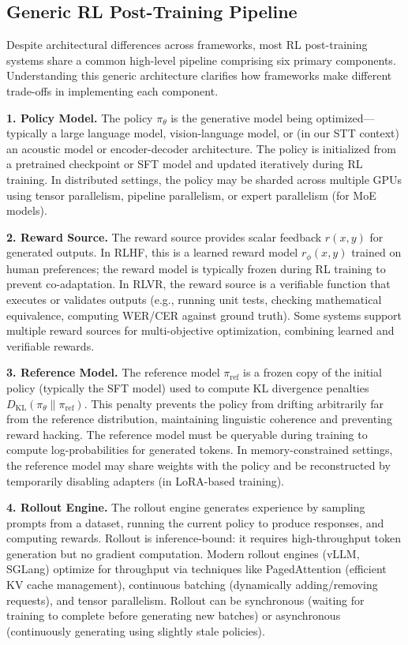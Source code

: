 \documentclass[conference]{IEEEtran}
\begin{document}
\subsection{Generic RL Post-Training Pipeline}

Despite architectural differences across frameworks, most RL post-training systems share a common high-level pipeline comprising six primary components. Understanding this generic architecture clarifies how frameworks make different trade-offs in implementing each component.

\textbf{1. Policy Model.} The policy $\pi_\theta$ is the generative model being optimized—typically a large language model, vision-language model, or (in our STT context) an acoustic model or encoder-decoder architecture. The policy is initialized from a pretrained checkpoint or SFT model and updated iteratively during RL training. In distributed settings, the policy may be sharded across multiple GPUs using tensor parallelism, pipeline parallelism, or expert parallelism (for MoE models).

\textbf{2. Reward Source.} The reward source provides scalar feedback $r(x, y)$ for generated outputs. In RLHF, this is a learned reward model $r_\phi(x, y)$ trained on human preferences; the reward model is typically frozen during RL training to prevent co-adaptation. In RLVR, the reward source is a verifiable function that executes or validates outputs (e.g., running unit tests, checking mathematical equivalence, computing WER/CER against ground truth). Some systems support multiple reward sources for multi-objective optimization, combining learned and verifiable rewards.

\textbf{3. Reference Model.} The reference model $\pi_{\text{ref}}$ is a frozen copy of the initial policy (typically the SFT model) used to compute KL divergence penalties $D_{\text{KL}}(\pi_\theta \| \pi_{\text{ref}})$. This penalty prevents the policy from drifting arbitrarily far from the reference distribution, maintaining linguistic coherence and preventing reward hacking. The reference model must be queryable during training to compute log-probabilities for generated tokens. In memory-constrained settings, the reference model may share weights with the policy and be reconstructed by temporarily disabling adapters (in LoRA-based training).

\textbf{4. Rollout Engine.} The rollout engine generates experience by sampling prompts from a dataset, running the current policy to produce responses, and computing rewards. Rollout is inference-bound: it requires high-throughput token generation but no gradient computation. Modern rollout engines (vLLM, SGLang) optimize for throughput via techniques like PagedAttention (efficient KV cache management), continuous batching (dynamically adding/removing requests), and tensor parallelism. Rollout can be synchronous (waiting for training to complete before generating new batches) or asynchronous (continuously generating using slightly stale policies).
\end{document}
